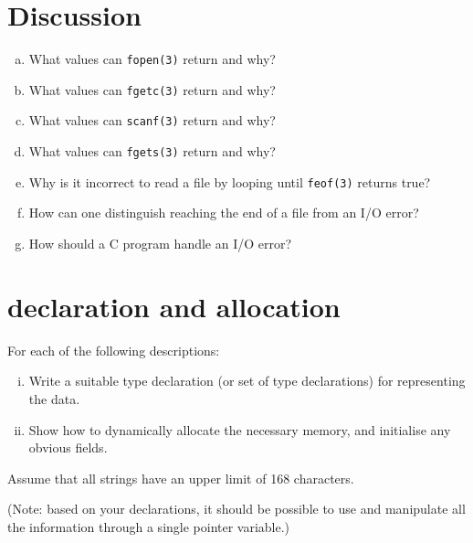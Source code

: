 \documentclass[a4paper,12pt]{article}
\begin{document}
\newpage

\section{Discussion}

\begin{enumerate}[a)]
	\item What values can \texttt{fopen(3)} return and why?
	\item What values can \texttt{fgetc(3)} return and why?
	\item What values can \texttt{scanf(3)} return and why?
	\item What values can \texttt{fgets(3)} return and why?
	\item Why is it incorrect to read a file by looping until
	      \texttt{feof(3)} returns true?
	\item How can one distinguish reaching the end of a file from
	      an I/O error?
	\item How should a C program handle an I/O error?
\end{enumerate}

\newpage

\section{\lstinline@struct@ declaration and allocation}

For each of the following descriptions:

\begin{enumerate}[i)]
	\item Write a suitable type declaration (or set of type
	      declarations) for representing the data.
	\item Show how to dynamically allocate the necessary memory,
	      and initialise any obvious fields.
\end{enumerate}

Assume that all strings have an upper limit of 168 characters.

(Note: based on your declarations, it should be possible to use and
manipulate all the information through a single pointer variable.)
\end{document}
